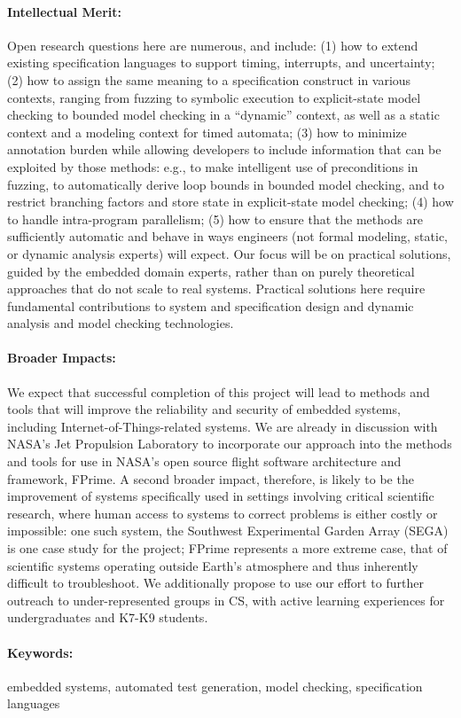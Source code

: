 \documentclass{article}
\begin{document}
\paragraph{Intellectual Merit:} Open research questions here are numerous, and include: (1) how to extend existing specification languages to support timing, interrupts, and uncertainty; (2) how to assign the same meaning to a specification construct in various contexts, ranging from fuzzing to symbolic execution to explicit-state model checking to bounded model checking in a ``dynamic'' context, as well as a static context and a modeling context for timed automata; (3) how to minimize annotation burden while allowing developers to include information that can be exploited by those methods: e.g., to make intelligent use of preconditions in fuzzing, to automatically derive loop bounds in bounded model checking, and to restrict branching factors and store state in explicit-state model checking; (4) how to handle intra-program parallelism; (5) how to ensure that the methods are sufficiently automatic and behave in ways engineers (not formal modeling, static, or dynamic analysis experts) will expect. Our focus will be on practical solutions, guided by the embedded domain experts, rather than on purely theoretical approaches that do not scale to real systems. Practical solutions here require fundamental contributions to system and specification design and dynamic analysis and model checking technologies.

\paragraph{Broader Impacts:} We expect that successful completion of this project will lead to methods and tools that will improve the reliability and security of embedded systems, including Internet-of-Things-related systems. We are already in discussion with NASA's Jet Propulsion Laboratory to incorporate our approach into the methods and tools for use in NASA's open source flight software architecture and framework, FPrime. A second broader impact, therefore, is likely to be the improvement of systems specifically used in settings involving critical scientific research, where human access to systems to correct problems is either costly or impossible: one such system, the Southwest Experimental Garden Array (SEGA) is one case study for the project; FPrime represents a more extreme case, that of scientific systems operating outside Earth's atmosphere and thus inherently difficult to troubleshoot.  We additionally propose to use our effort to further outreach to under-represented groups in CS, with active learning experiences for undergraduates and K7-K9 students.

\paragraph{Keywords:} embedded systems, automated test generation, model checking, specification languages
\end{document}
